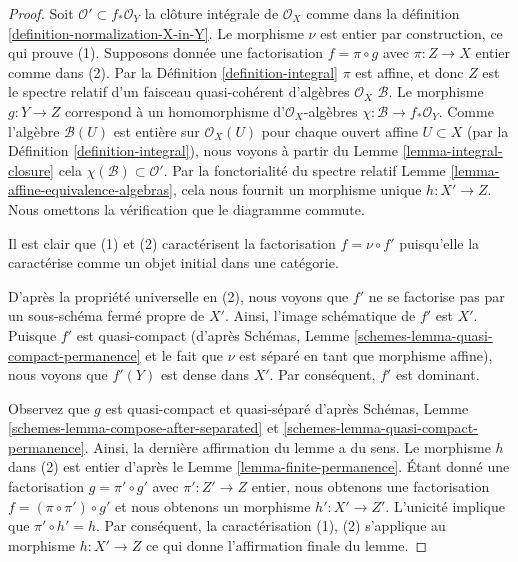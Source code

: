 \begin{proof}
Soit $\mathcal{O}' \subset f_*\mathcal{O}_Y$ la clôture intégrale de $\mathcal{O}_X$ comme dans
la définition \ref{definition-normalization-X-in-Y}. Le morphisme $\nu$ est entier
par construction, ce qui prouve (1). Supposons donnée
une factorisation $f = \pi \circ g$ avec $\pi : Z \to X$ entier comme
dans (2). Par la Définition \ref{definition-integral} $\pi$
est affine, et donc $Z$ est le
spectre relatif d'un faisceau quasi-cohérent d'algèbres $\mathcal{O}_X$
$\mathcal{B}$. Le morphisme $g : Y \to Z$ correspond à un homomorphisme
d'$\mathcal{O}_X$-algèbres $\chi : \mathcal{B} \to f_*\mathcal{O}_Y$. Comme l'algèbre $\mathcal{B}(U)$ est entière
sur $\mathcal{O}_X(U)$ pour chaque ouvert affine $U \subset X$
(par la Définition \ref{definition-integral}), nous
voyons à partir du Lemme \ref{lemma-integral-closure}
cela $\chi(\mathcal{B}) \subset \mathcal{O}'$. Par la fonctorialité
du spectre relatif Lemme \ref{lemma-affine-equivalence-algebras},
cela nous fournit un morphisme
unique $h : X' \to Z$. Nous omettons
la vérification que le diagramme commute.

\medskip\noindent
Il est clair que (1) et (2) caractérisent la factorisation $f = \nu \circ f'$ puisqu'elle
la caractérise comme un objet initial dans une catégorie.

\medskip\noindent D'après
la propriété universelle en (2), nous voyons que $f'$ ne se factorise pas par
un sous-schéma fermé propre de $X'$. Ainsi, l'image schématique de $f'$
est $X'$. Puisque $f'$ est quasi-compact (d'après
Schémas, Lemme \ref{schemes-lemma-quasi-compact-permanence} et le fait que $\nu$ est séparé en tant que morphisme
affine), nous voyons que $f'(Y)$ est dense dans $X'$. Par conséquent,
$f'$ est dominant.

\medskip\noindent
Observez que $g$ est quasi-compact et quasi-séparé
d'après Schémas, Lemme \ref{schemes-lemma-compose-after-separated} et \ref{schemes-lemma-quasi-compact-permanence}.
Ainsi, la dernière affirmation du lemme a du sens. Le morphisme
$h$ dans
(2) est entier d'après le Lemme \ref{lemma-finite-permanence}. Étant donné une factorisation
$g = \pi' \circ g'$ avec $\pi' : Z' \to Z$ entier, nous obtenons
une factorisation $f = (\pi \circ \pi') \circ g'$ et nous obtenons un morphisme
$h' : X' \to Z'$. L'unicité implique que $\pi' \circ h' = h$. Par
conséquent, la caractérisation (1), (2) s'applique au
morphisme $h : X' \to Z$ ce qui donne l'affirmation finale du lemme.
\end{proof}

